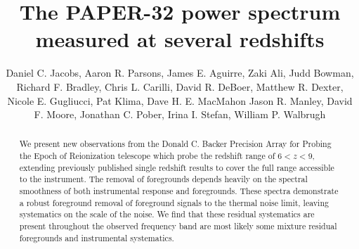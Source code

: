 \documentclass[preprint]{aastex}
\begin{document}
\title{The PAPER-32 power spectrum measured at several redshifts}
\author{
Daniel C. Jacobs,
Aaron R. Parsons,
James E. Aguirre,
Zaki Ali,
Judd Bowman,
Richard F. Bradley,
Chris L.  Carilli,
David R. DeBoer,
Matthew R. Dexter,
Nicole E. Gugliucci,
Pat Klima,
Dave H. E. MacMahon
Jason R. Manley,
David F. Moore,
Jonathan C. Pober,
Irina I. Stefan,
William P. Walbrugh}


\begin{abstract}
We present new observations from the Donald C. Backer Precision Array for Probing the Epoch of Reionization telescope which probe the redshift range of $6<z<9$, extending previously published single redshift results to cover the full range accessible to the instrument.  The removal of foregrounds depends heavily on the spectral smoothness of both instrumental response and foregrounds.  These spectra demonstrate a robust foreground removal of foreground signals to the thermal noise limit, leaving systematics on the scale of the noise. We find that these residual systematics are present throughout the observed frequency band are most likely some mixture residual foregrounds and instrumental systematics.
\end{abstract}

\end{document}
